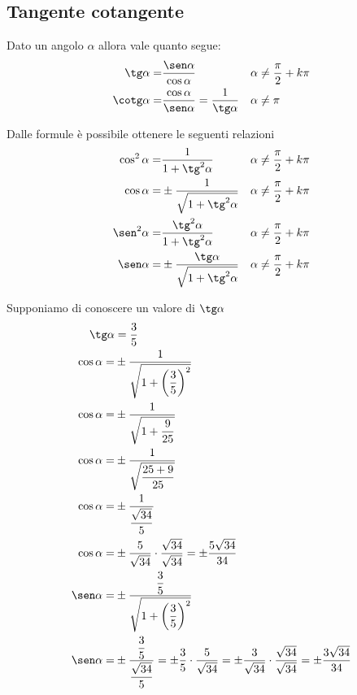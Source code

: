 \subsection{Tangente cotangente}
\label{sec:TangenteCotangente}
\begin{definizione}
	Dato un angolo $\alpha$ allora vale quanto segue:
\begin{align}
\tg\alpha=&{}\dfrac{\sen\alpha}{\cos\alpha}&\alpha&{}\neq\dfrac{\pi}{2}+k\pi\label{equ:tangente1}\\
\cotg\alpha=&{}\dfrac{\cos\alpha}{\sen\alpha}={}\dfrac{1}{\tg\alpha}& \alpha&{}\neq\pi\label{equ:cotangente1}
\end{align}
\end{definizione}
Dalle formule\nobs{} è possibile ottenere le seguenti relazioni
\begin{align*}
\cos^{2}\alpha=&{}\dfrac{1}{1+{\tg}^{2}\alpha} &\alpha&{}\neq\dfrac{\pi}{2}+k\pi\\
\cos\alpha=&{}\pm\dfrac{1}{\sqrt{1+{\tg}^{2}\alpha}} &\alpha{}&\neq\dfrac{\pi}{2}+k\pi\\
\sen^{2}\alpha=&{}\dfrac{\tg^{2}\alpha}{1+\tg^{2}\alpha}&\alpha{}&\neq\dfrac{\pi}{2}+k\pi\\
\sen\alpha=&{}\pm\dfrac{\tg\alpha}{\sqrt{1+\tg^{2}\alpha}}&\alpha{}&\neq\dfrac{\pi}{2}+k\pi
\end{align*}
\begin{esempio}
Supponiamo di conoscere un valore di $\tg\alpha$
\begin{align*}
\tg\alpha&{}=\dfrac{3}{5}\\
\cos\alpha=&{}\pm\dfrac{1}{\sqrt{1+\left(\dfrac{3}{5}\right)^2}}\\
\cos\alpha=&{}\pm\dfrac{1}{\sqrt{1+\dfrac{9}{25}}}\\
\cos\alpha=&{}\pm\dfrac{1}{\sqrt{\dfrac{25+9}{25}}}\\
\cos\alpha=&{}\pm\dfrac{1}{\dfrac{\sqrt{34}}{5}}\\
\cos\alpha=&{}\pm\dfrac{5}{\sqrt{34}}\cdot\dfrac{\sqrt{34}}{\sqrt{34}}=\pm\dfrac{5\sqrt{34}}{34}\\
\sen\alpha=&{}\pm\dfrac{\dfrac{3}{5}}{\sqrt{1+\left(\dfrac{3}{5}\right)^2}}\\
\sen\alpha=&{}\pm\dfrac{\dfrac{3}{5}}{\dfrac{\sqrt{34}}{5}}=\pm\dfrac{3}{5}\cdot\dfrac{5}{\sqrt{34}}=\pm\dfrac{3}{\sqrt{34}}\cdot\dfrac{\sqrt{34}}{\sqrt{34}}=\pm\dfrac{3\sqrt{34}}{34}
\end{align*}
\end{esempio}
